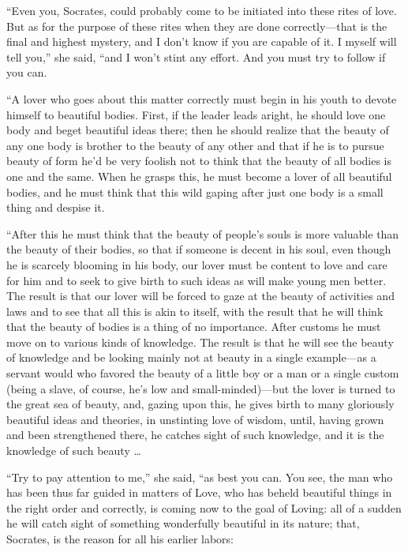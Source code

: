  “Even you, Socrates, could probably come to be initiated
into these rites of love. But as for the purpose of these rites when
they are done correctly---that is the final and highest mystery, and I
don't know if you are capable of it. I myself will tell you,” she said,
“and I won't stint any effort. And you must try to follow if you can.

“A lover who goes about this matter correctly must begin in his youth to
devote himself to beautiful bodies. First, if the
leader leads aright,
he should love one body and beget beautiful ideas there; then he should
 realize that the beauty of any one body is brother to the beauty
of any other and that if he is to pursue beauty of form he'd be very
foolish not to think that the beauty of all bodies is one and the same.
When he grasps this, he must become a lover of all beautiful bodies, and
he must think that this wild gaping after just one body is a small thing
and despise it.

“After this he must think that the beauty of people's souls is more
valuable than the beauty of their bodies, so that if someone is decent
in  his soul, even though he is scarcely blooming in his body,
our lover must be content to love and care for him and to seek to give
birth to such ideas as will make young men better. The result is that
our lover will be forced to gaze at the beauty of activities and laws
and to see that all this is akin to itself, with the result that he will
think that the beauty of bodies is a thing of no importance. After
customs he must move on to various kinds of knowledge. The result is
that he will see the beauty of knowledge and  be looking mainly
not at beauty in a single example---as a servant would who favored the
beauty of a little boy or a man or a single custom (being a slave, of
course, he's low and small-minded)---but the lover is turned to the
great sea of beauty, and, gazing upon this, he gives birth to many
gloriously beautiful ideas and theories, in unstinting love of
wisdom, until, having
grown and been strengthened there, he catches sight of such 
knowledge, and it is the knowledge of such beauty \ldots{}

“Try to pay attention to me,” she said, “as best you can. You see, the
man who has been thus far guided in matters of Love, who has beheld
beautiful things in the right order and correctly, is coming now to the
goal of Loving: all of a sudden he will catch sight of something
wonderfully beautiful in its nature; that, Socrates, is the reason for
all his earlier labors: 


